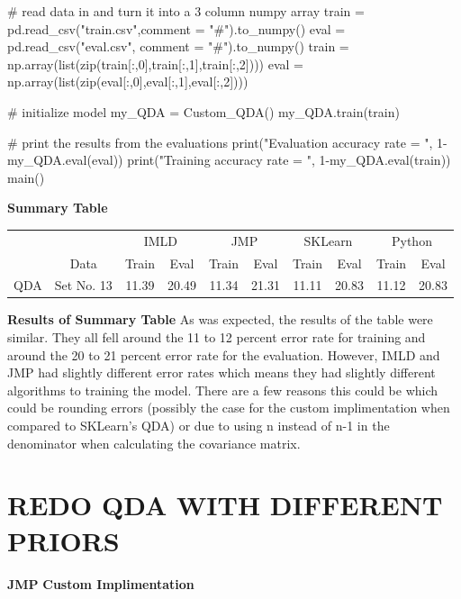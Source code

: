 \documentclass{article}
\begin{document}
\begin{flushleft}
\begin{python}
        # read data in and turn it into a 3 column numpy array
        train = pd.read_csv("train.csv",comment = "#").to_numpy()
        eval = pd.read_csv("eval.csv", comment = "#").to_numpy()
        train = np.array(list(zip(train[:,0],train[:,1],train[:,2])))
        eval = np.array(list(zip(eval[:,0],eval[:,1],eval[:,2])))

        # initialize model
        my_QDA = Custom_QDA()
        my_QDA.train(train)
        
        # print the results from the evaluations
        print("Evaluation accuracy rate = ", 1-my_QDA.eval(eval))
        print("Training accuracy rate = ", 1-my_QDA.eval(train))
main()
\end{python}
\textbf{Summary Table}\break
\break
\end{flushleft}
\centering
\begin{tabular}{|c| c| c| c| c| c| c| c| c| c|}
\hline
\rowcolor{gray!20}
 &  & \multicolumn{2}{|c|}{IMLD} & \multicolumn{2}{|c|}{JMP} & \multicolumn{2}{|c|}{SKLearn} & \multicolumn{2}{|c|}{Python}\\\cline{3-10}
\rowcolor{gray!20}
\multirow{-2}{*}{Algorithm}&\multirow{-2}{*}{Data}& \multicolumn{1}{|c|}{Train} & \multicolumn{1}{|c|}{Eval} & \multicolumn{1}{|c|}{Train} & \multicolumn{1}{|c|}{Eval}& \multicolumn{1}{|c|}{Train} & \multicolumn{1}{|c|}{Eval}& \multicolumn{1}{|c|}{Train} & \multicolumn{1}{|c|}{Eval}\\
\hline
QDA & Set No. 13 & 11.39 & 20.49 & 11.34 & 21.31 & 11.11 & 20.83 & 11.12 & 20.83\\
\hline 
\end{tabular}
\begin{flushleft}
\break
\textbf{Results of Summary Table}\break
\break
As was expected, the results of the table were similar. They all fell around the 11 to 12 percent error rate for training and around the 20 to 21 percent error rate for the evaluation. However, IMLD and JMP had slightly different error rates which means they had slightly different algorithms to training the model. There are a few reasons this could be which could be rounding errors (possibly the case for the custom implimentation when compared to SKLearn's QDA) or due to using n instead of n-1 in the denominator when calculating the covariance matrix.  
\section{\MakeUppercase{Redo QDA With Different Priors}}
\textbf{JMP}\break
\break
\textbf{Custom Implimentation}\break
\break
\end{flushleft}
\end{document}
